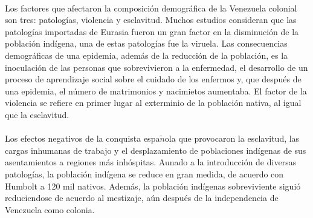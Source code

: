 \documentclass[11pt,spanish,letterpaper]{article}
\theoremstyle{plain}
\begin{document}
\\
Los factores que afectaron la composici\'on demogr\'afica de la Venezuela colonial son tres: patolog\'ias,  violencia y esclavitud. Muchos estudios consideran que las patolog\'ias importadas de Eurasia fueron un gran factor en la disminuci\'on de la poblaci\'on ind\'igena, una de estas patolog\'ias fue la viruela. Las consecuencias demogr\'aficas de una epidemia, adem\'as de la reducci\'on de la poblaci\'on, es la inoculaci\'on de las personas que sobrevivieron a la enfermedad, el desarrollo de un proceso de aprendizaje social sobre el cuidado de los enfermos y, que despu\'es de una epidemia, el n\'umero de matrimonios y nacimietos aumentaba. El factor de la violencia se refiere en primer lugar al exterminio de la poblaci\'on nativa, al igual que la esclavitud.\\
\\
Los efectos negativos de la conquista espa$\tilde{n}$ola que provocaron la esclavitud, las cargas inhumanas de trabajo y el desplazamiento de poblaciones ind\'igenas de sus asentamientos a regiones m\'as inh\'ospitas. Aunado a la introducci\'on de diversas patolog\'ias, la poblaci\'on ind\'igena se reduce en gran medida, de acuerdo con Humbolt a 120 mil nativos. Adem\'as, la poblaci\'on ind\'igenas sobreviviente sigui\'o reduciendose de acuerdo al mestizaje, a\'un despu\'es de la independencia de Venezuela como colonia.


\end{document}
